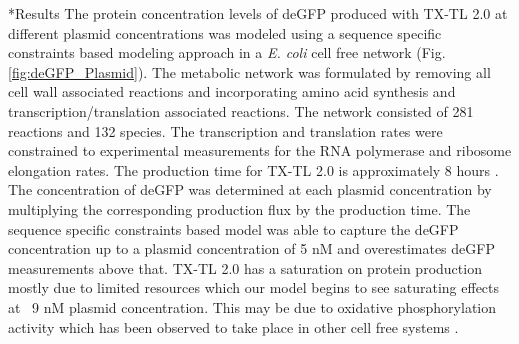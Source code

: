\documentclass[12pt]{article}
\makeatletter
\renewcommand\section{\@startsection
	{subsection}{2}{0mm}
	{-0.2in}
	{0.05\baselineskip}
	{\normalfont\large\bfseries}}
\makeatother
\begin{document}
\clearpage




\section*{Results}
The protein concentration levels of deGFP produced with TX-TL 2.0 at different plasmid concentrations was modeled using a sequence specific constraints based modeling approach in a \textit{E. coli} cell free network (Fig. \ref{fig:deGFP_Plasmid}).
The metabolic network was formulated by removing all cell wall associated reactions and incorporating amino acid synthesis and transcription/translation associated reactions. 
The network consisted of 281 reactions and 132 species. 
The transcription and translation rates were constrained to experimental measurements \cite{2016_Garamella_etal_TXTL} for the RNA polymerase and ribosome elongation rates. 
The production time for TX-TL 2.0 is approximately 8 hours \cite{2016_Garamella_etal_TXTL}. 
The concentration of deGFP was determined at each plasmid concentration by multiplying the corresponding production flux by the production time. 
The sequence specific constraints based model was able to capture the deGFP concentration up to a plasmid concentration of 5 nM and overestimates deGFP measurements above that.
TX-TL 2.0 has a saturation on protein production mostly due to limited resources which our model begins to see saturating effects at ~9 nM plasmid concentration. 
This may be due to oxidative phosphorylation activity which has been observed to take place in other cell free systems \cite{2008_Jewett_etal_OxPhos}.
\end{document}

